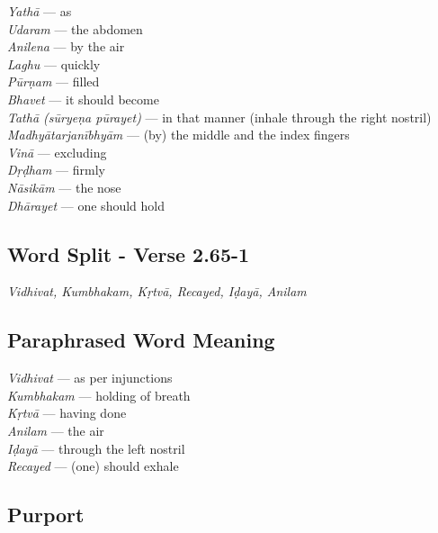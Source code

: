 \begin{multicols}{2}
\textit{Yathā} --- as \\
\textit{Udaram} --- the abdomen \\
\textit{Anilena} --- by the air \\
\textit{Laghu} --- quickly \\
\textit{Pūrṇam} --- filled \\
\textit{Bhavet} --- it should become \\
\textit{Tathā (sūryeṇa pūrayet)} --- in that manner (inhale through the right nostril)\\
\textit{Madhyātarjanībhyām} --- (by) the middle and the index fingers \\
\textit{Vinā}  --- excluding\\
\textit{Dṛḍham} --- firmly\\
\textit{Nāsikām} --- the nose\\
\textit{Dhārayet} --- one should hold
\end{multicols}

\subsection*{Word Split - Verse 2.65-1}

\textit{Vidhivat, Kumbhakam, Kṛtvā, Recayed, Iḍayā, Anilam}
\newpage
\subsection*{Paraphrased Word Meaning}

\begin{multicols}{2}
\textit{Vidhivat} --- as per injunctions\\
\textit{Kumbhakam} --- holding of breath \\
\textit{Kṛtvā} --- having done \\
\textit{Anilam} --- the air \\
\textit{Iḍayā} --- through the left nostril\\
\textit{Recayed} --- (one) should exhale
\end{multicols}

\subsection*{Purport}


